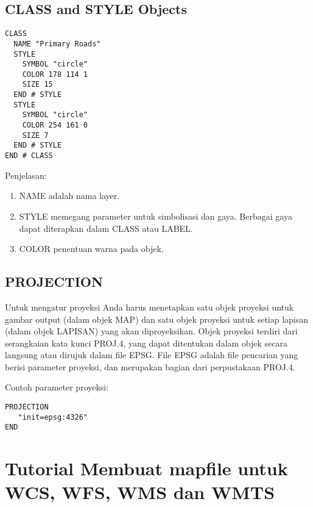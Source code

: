 \subsection{CLASS and STYLE Objects}
\begin{lstlisting}
CLASS
  NAME "Primary Roads"
  STYLE
    SYMBOL "circle"
    COLOR 178 114 1
    SIZE 15
  END # STYLE
  STYLE
    SYMBOL "circle"
    COLOR 254 161 0
    SIZE 7
  END # STYLE
END # CLASS
\end{lstlisting}

Penjelasan:
\begin{enumerate}
\item NAME adalah nama layer.
\item STYLE memegang parameter untuk simbolisasi dan gaya. Berbagai gaya dapat diterapkan dalam CLASS atau LABEL.
\item COLOR penentuan warna pada objek.
\end{enumerate}

\subsection{PROJECTION}
Untuk mengatur proyeksi Anda harus menetapkan satu objek proyeksi untuk gambar output (dalam objek MAP) dan satu objek proyeksi untuk setiap lapisan (dalam objek LAPISAN) yang akan diproyeksikan. Objek proyeksi terdiri dari serangkaian kata kunci PROJ.4, yang dapat ditentukan dalam objek secara langsung atau dirujuk dalam file EPSG. File EPSG adalah file pencarian yang berisi parameter proyeksi, dan merupakan bagian dari perpustakaan PROJ.4.

Contoh parameter proyeksi:
\begin{lstlisting}
PROJECTION
   "init=epsg:4326"
END
\end{lstlisting}

\section{Tutorial Membuat mapfile untuk WCS, WFS, WMS dan WMTS}
